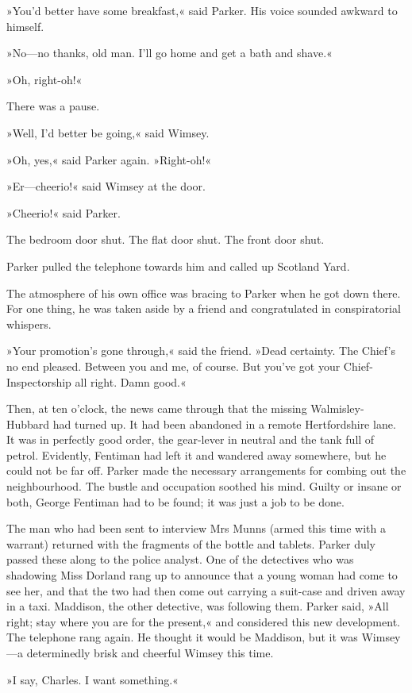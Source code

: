 »You'd better have some breakfast,« said Parker. His voice sounded awkward to himself.

»No—no thanks, old man. I'll go home and get a bath and shave.«

»Oh, right-oh!«

There was a pause.

»Well, I'd better be going,« said Wimsey.

»Oh, yes,« said Parker again. »Right-oh!«

»Er—cheerio!« said Wimsey at the door.

»Cheerio!« said Parker.

The bedroom door shut. The flat door shut. The front door shut.

Parker pulled the telephone towards him and called up Scotland Yard.

The atmosphere of his own office was bracing to Parker when he got down there. For one thing, he was taken aside by a friend and congratulated in conspiratorial whispers.

»Your promotion's gone through,« said the friend. »Dead certainty. The Chief's no end pleased. Between you and me, of course. But you've got your Chief-Inspectorship all right. Damn good.«

Then, at ten o'clock, the news came through that the missing Walmisley-Hubbard had turned up. It had been abandoned in a remote Hertfordshire lane. It was in perfectly good order, the gear-lever in neutral and the tank full of petrol. Evidently, Fentiman had left it and wandered away somewhere, but he could not be far off. Parker made the necessary arrangements for combing out the neighbourhood. The bustle and occupation soothed his mind. Guilty or insane or both, George Fentiman had to be found; it was just a job to be done.

The man who had been sent to interview Mrs Munns (armed this time with a warrant) returned with the fragments of the bottle and tablets. Parker duly passed these along to the police analyst. One of the detectives who was shadowing Miss Dorland rang up to announce that a young woman had come to see her, and that the two had then come out carrying a suit-case and driven away in a taxi. Maddison, the other detective, was following them. Parker said, »All right; stay where you are for the present,« and considered this new development. The telephone rang again. He thought it would be Maddison, but it was Wimsey—a determinedly brisk and cheerful Wimsey this time.

»I say, Charles. I want something.«


